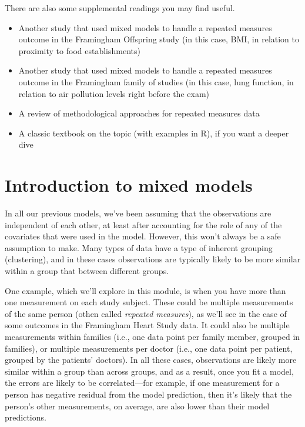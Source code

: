 \documentclass[
]{book}
\providecommand{\tightlist}{%
  \setlength{\itemsep}{0pt}\setlength{\parskip}{0pt}}
\begin{document}
There are also some supplemental readings you may find useful.

\begin{itemize}
\tightlist
\item
  \citet{block2011proximity} Another study that used mixed models to handle a repeated
  measures outcome in the Framingham Offspring study (in this case, BMI, in
  relation to proximity to food establishments)
\item
  \citet{rice2013short} Another study that used mixed models to handle a repeated
  measures outcome in the Framingham family of studies (in this case, lung
  function, in relation to air pollution levels right before the exam)
\item
  \citet{gibbons2010advances} A review of methodological approaches for repeated
  measures data
\item
  \citet{gelman2006data} A classic textbook on the topic (with examples in R), if you
  want a deeper dive
\end{itemize}

\section{Introduction to mixed models}\label{introduction-to-mixed-models}

In all our previous models, we've been assuming that the observations are
independent of each other, at least after accounting for the role of any
of the covariates that were used in the model. However, this won't always
be a safe assumption to make. Many types of data have a type of inherent
grouping (clustering), and in these cases observations are typically likely to be more
similar within a group that between different groups.

One example, which we'll explore in this module, is when you have more than one
measurement on each study subject. These could be multiple measurements of the
same person (othen called \emph{repeated measures}), as we'll see in the case of some
outcomes in the Framingham Heart Study data. It could also be multiple
measurements within families (i.e., one data point per family member, grouped in
families), or multiple measurements per doctor (i.e., one data point per
patient, grouped by the patients' doctors). In all these cases, observations
are likely more similar within a group than across groups, and as a result,
once you fit a model, the errors are likely to be correlated---for example,
if one measurement for a person has negative residual from the model prediction,
then it's likely that the person's other measurements, on average, are also
lower than their model predictions.
\end{document}
